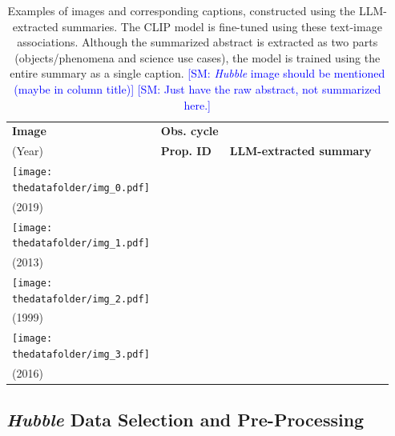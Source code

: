 \documentclass[10pt]{article} %
\newcommand{\SM}[1]{\textcolor{blue}{[SM: #1]}}
\newcommand{\hubble}{\emph{Hubble}\xspace}
\begin{document}
\begin{table}[h!]
  \centering
  \begin{tabular}{m{} p{1.9cm} p{1.9cm} m{8cm}}
      \toprule
      \centering \bfseries Image & \centering \bfseries Obs. cycle \\ (Year) & \centering \bfseries Prop. ID & \centering \bfseries LLM-extracted summary \tabularnewline
      \midrule
      \centering \texttt{[image: \\thedatafolder/img\_0.pdf]} & \centering  \\ (2019) & \centering  &  {\scriptsize } \tabularnewline
      \midrule
      \centering \texttt{[image: \\thedatafolder/img\_1.pdf]} & \centering  \\ (2013) & \centering  &  {\scriptsize } \tabularnewline
      \midrule
      \centering \texttt{[image: \\thedatafolder/img\_2.pdf]} & \centering  \\ (1999) & \centering  &  {\scriptsize } \tabularnewline
      \midrule
      \centering \texttt{[image: \\thedatafolder/img\_3.pdf]} & \centering  \\ (2016) & \centering  &  {\scriptsize } \tabularnewline
      \bottomrule
  \end{tabular}
  \caption{Examples of images and corresponding captions, constructed using the LLM-extracted summaries.
%
The CLIP model is fine-tuned using these text-image associations.
%
Although the summarized abstract is extracted as two parts (objects/phenomena and science use cases), the model is trained using the entire summary as a single caption. \SM{\hubble image should be mentioned (maybe in column title)} \SM{Just have the raw abstract, not summarized here.}}
  \label{tab:dataset}
\end{table}

\subsection{\hubble Data Selection and Pre-Processing}
\end{document}
